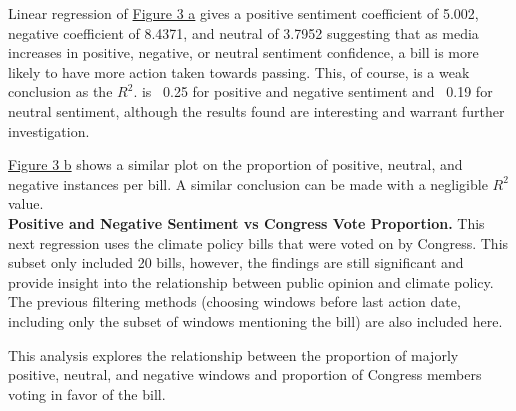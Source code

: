 \documentclass[letterpaper,11pt]{article}
\begin{document}
    Linear regression of \href{fig:scatterplot}{Figure 3 a} gives a positive sentiment coefficient of 5.002, negative coefficient of 8.4371, and neutral of 3.7952 suggesting that as media increases in positive, negative, or neutral sentiment confidence, a bill is more likely to have more action taken towards passing. This, of course, is a weak conclusion as the $R^2$. is ~0.25 for positive and negative sentiment and ~0.19 for neutral sentiment, although the results found are interesting and warrant further investigation.
    
    \href{fig:scatterplot}{Figure 3 b} shows a similar plot on the proportion of positive, neutral, and negative instances per bill. A similar conclusion can be made with a negligible $R^2$ value. \\
    
    \textbf{Positive and Negative Sentiment vs Congress Vote Proportion.} 
    This next regression uses the climate policy bills that were voted on by Congress. This subset only included 20 bills, however, the findings are still significant and provide insight into the relationship between public opinion and climate policy. The previous filtering methods (choosing windows before last action date, including only the subset of windows mentioning the bill) are also included here. 

    This analysis explores the relationship between the proportion of majorly positive, neutral, and negative windows and proportion of Congress members voting in favor of the bill. 
\end{document}
